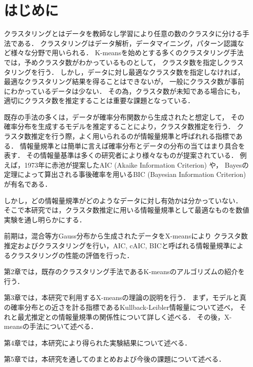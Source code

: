 \section{はじめに}
クラスタリングとはデータを教師なし学習により任意の数のクラスタに分ける手法である．
クラスタリングはデータ解析，データマイニング，パターン認識など様々な分野で用いられる．
K-meansを始めとする多くのクラスタリング手法では，予めクラスタ数がわかっているものとして，
クラスタ数を指定しクラスタリングを行う．
しかし，データに対し最適なクラスタ数を指定しなければ，最適なクラスタリング結果を得ることはできないが，
一般にクラスタ数が事前にわかっているデータは少ない．
その為，クラスタ数が未知である場合にも，適切にクラスタ数を推定することは重要な課題となっている．

既存の手法の多くは，データが確率分布関数から生成されたと想定して，
その確率分布を生成するモデルを推定することにより，クラスタ数推定を行う．
クラスタ数推定を行う際，よく用いられるのが情報量規準と呼ばれれる指標である．
情報量規準とは簡単に言えば確率分布とデータの分布の当てはまり具合を表す．
その情報量基準は多くの研究者により様々なものが提案されている．
例えば，1973年に赤池が提案したAIC (Akaike Information Criterion) や，
Bayesの定理によって算出される事後確率を用いるBIC (Bayesian Information Criterion)が有名である．

しかし，どの情報量規準がどのようなデータに対し有効かは分かっていない．
そこで本研究では，クラスタ数推定に用いる情報量規準として最適なものを数値実験を通し明らかにする．

前期は，混合等方Gauss分布から生成されたデータをX-meansにより
クラスタ数推定およびクラスタリングを行い，AIC, cAIC, BICと呼ばれる情報量規準によるクラスタリングの性能の評価を行った．

第2章では，既存のクラスタリング手法であるK-meansのアルゴリズムの紹介を行う．

第3章では，本研究で利用するX-meansの理論の説明を行う．
まず，モデルと真の確率分布との近さを計る指標であるKullback-Leibler情報量について述べ，
それと最尤推定との情報量規準の関係性について詳しく述べる．
その後，X-meansの手法について述べる．

第4章では，本研究により得られた実験結果について述べる．

第5章では，本研究を通してのまとめおよび今後の課題について述べる．
